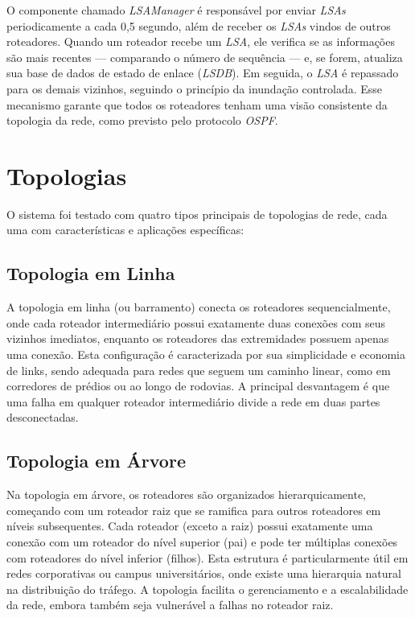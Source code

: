 \documentclass[12pt,a4paper]{report}
\begin{document}
O componente chamado \textit{LSAManager} é responsável por enviar \textit{LSAs} periodicamente a cada 0,5 segundo, além de receber os \textit{LSAs} vindos de outros roteadores. Quando um roteador recebe um \textit{LSA}, ele verifica se as informações são mais recentes — comparando o número de sequência — e, se forem, atualiza sua base de dados de estado de enlace (\textit{LSDB}). Em seguida, o \textit{LSA} é repassado para os demais vizinhos, seguindo o princípio da inundação controlada. Esse mecanismo garante que todos os roteadores tenham uma visão consistente da topologia da rede, como previsto pelo protocolo \textit{OSPF}.

\section{Topologias}

O sistema foi testado com quatro tipos principais de topologias de rede, cada uma com características e aplicações específicas:

\subsection{Topologia em Linha}

A topologia em linha (ou barramento) conecta os roteadores sequencialmente, onde cada roteador intermediário possui exatamente duas conexões com seus vizinhos imediatos, enquanto os roteadores das extremidades possuem apenas uma conexão. Esta configuração é caracterizada por sua simplicidade e economia de links, sendo adequada para redes que seguem um caminho linear, como em corredores de prédios ou ao longo de rodovias. A principal desvantagem é que uma falha em qualquer roteador intermediário divide a rede em duas partes desconectadas.

\subsection{Topologia em Árvore}

Na topologia em árvore, os roteadores são organizados hierarquicamente, começando com um roteador raiz que se ramifica para outros roteadores em níveis subsequentes. Cada roteador (exceto a raiz) possui exatamente uma conexão com um roteador do nível superior (pai) e pode ter múltiplas conexões com roteadores do nível inferior (filhos). Esta estrutura é particularmente útil em redes corporativas ou campus universitários, onde existe uma hierarquia natural na distribuição do tráfego. A topologia facilita o gerenciamento e a escalabilidade da rede, embora também seja vulnerável a falhas no roteador raiz.
\end{document}
